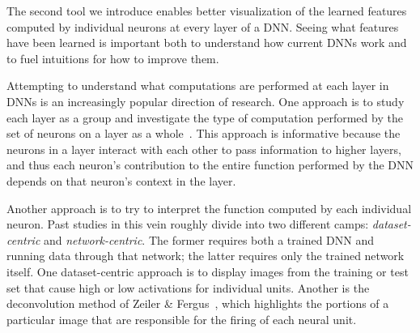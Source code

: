 \documentclass{article}
\begin{document}


The second tool we introduce enables better visualization of the learned features computed by individual neurons at every layer of a DNN. Seeing what features have been learned is important both to understand how current DNNs work and to fuel intuitions for how to improve them. 

Attempting to understand what computations are performed at each layer in DNNs is an increasingly popular direction of research. One approach is to study each layer as a group and investigate the type of computation performed by the set of neurons on a layer as a whole~\cite{yosinski-2014-NIPS-how-transferable-are-features-in-deep,mahendran-2014-arXiv-understanding-deep-image}. This approach is informative because the neurons in a layer interact with each other to pass information to higher layers, and thus each neuron's contribution to the entire function performed by the DNN depends on that neuron's context in the layer. 

Another approach is to try to interpret the function computed by each individual neuron. Past studies in this vein roughly divide into two different camps: \emph{dataset-centric} and \emph{network-centric}. The former requires both a trained DNN and running data through that network; the latter requires only the trained network itself. One dataset-centric approach is to display images from the training or test set that cause high or low activations for individual units. Another is the deconvolution method of Zeiler \& Fergus~, which highlights the portions of a particular image that are responsible for the firing of each neural unit.
\end{document}
